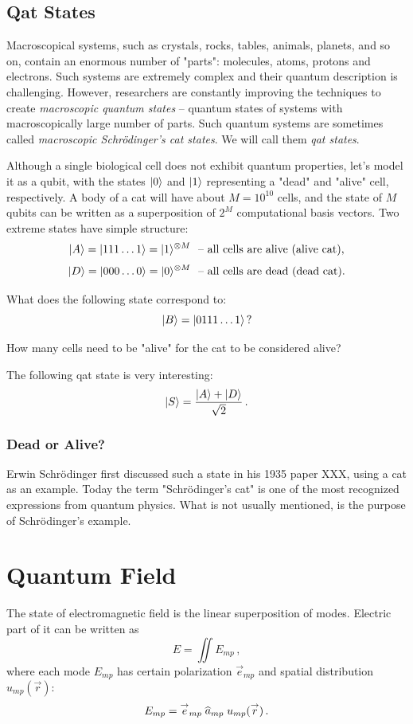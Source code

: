 \subsection{Qat States}
Macroscopical systems, such as crystals, rocks, tables, animals, planets, and so on, contain an enormous number of "parts": molecules, atoms, protons and electrons. Such systems are extremely complex and their quantum description is challenging. However, researchers are constantly improving the techniques to create \emph{macroscopic quantum states} -- quantum states of systems with macroscopically large number of parts. Such quantum systems are sometimes called \emph{macroscopic Schr\"{o}dinger's cat states}. We will call them \emph{qat states}.

Although a single biological cell does not exhibit quantum properties, let's model it as a qubit, with the states $|{0}\rangle$ and $|{1}\rangle$ representing a "dead" and "alive" cell, respectively. A
body of a cat will have about $M=10^{10}$ cells, and the state of $M$ qubits can be written as a superposition of $2^M$ computational basis vectors. Two extreme states have simple structure:
\[
|{A}\rangle=|{111\ldots 1}\rangle=|{1}\rangle^{\otimes M}\,\,\textrm{ -- all cells are alive (alive cat)},
\]
\[
|{D}\rangle=|{000\ldots 0}\rangle=|{0}\rangle^{\otimes M}\,\,\textrm{ -- all cells are dead (dead cat)}.
\]
\begin{exercise}
	What does the following state correspond to:
	\[
	|{B}\rangle = |{0111\ldots 1}\rangle\,?
	\]
	
	
	How many cells need to be "alive" for the cat to be considered alive?
\end{exercise}

The following qat state is very interesting:
\[
|{S}\rangle = \frac{|{A}\rangle+|{D}\rangle}{\sqrt{2}}\,.
\]

\subsubsection*{Dead or Alive?}
Erwin Schr\"{o}dinger first discussed such a state in his 1935 paper XXX, using a cat as an example. Today the term "Schr\"{o}dinger's cat" is one of the most recognized expressions from quantum physics. What is not usually mentioned, is the purpose of Schr\"{o}dinger's example.

\section{Quantum Field}\label{sec:QuantumField}
The state of electromagnetic field  is the linear superposition of modes. Electric part of it can be written as
\[
E = \iint E_{mp}\,,
\]
where each mode $E_{mp}$ has certain polarization $\vec{e}_{mp}$ and spatial distribution $u_{mp}(\vec{r})$:
\[
E_{mp} = \vec{e}_{mp} \op{a}_{mp} u_{mp}(\vec{r})\,.
\]

